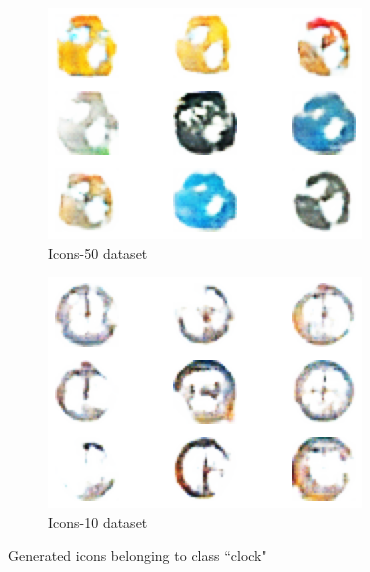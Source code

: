 \begin{figure}[htbp]
    \begin{subfigure}[h]{0.4\linewidth}
        \includegraphics[width=\linewidth]{images/gen_icons/icons50_clock}
        \caption{Icons-50 dataset}
        \label{fig:Icons50Clock}
    \end{subfigure}
    \hfill
    \begin{subfigure}[h]{0.4\linewidth}
        \includegraphics[width=\linewidth]{images/gen_icons/icons10_clock}
        \caption{Icons-10 dataset}
        \label{fig:Icons10Clock}
    \end{subfigure}
    \caption{Generated icons belonging to class ``clock"}
\end{figure}

